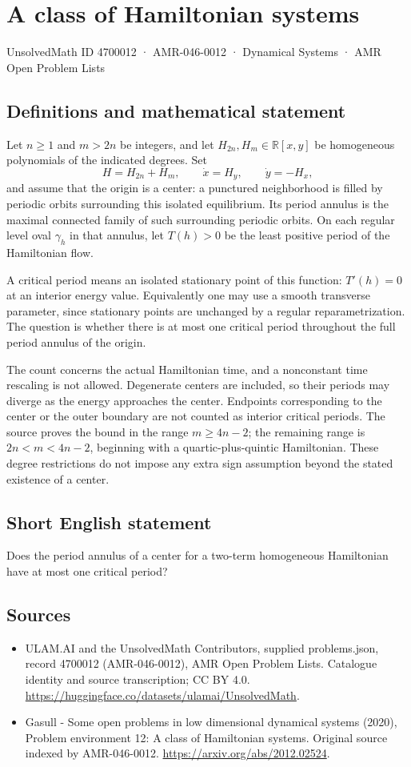 \documentclass[11pt,a4paper]{article}
\begin{document}
\section*{A class of Hamiltonian systems}\label{4700012}
{\small UnsolvedMath ID 4700012 · AMR-046-0012 · Dynamical Systems · AMR Open Problem Lists}
\subsection{Definitions and mathematical statement}
Let $n\ge1$ and $m>2n$ be integers, and let $H_{2n},H_m\in\mathbb R[x,y]$
be homogeneous polynomials of the indicated degrees. Set
\[
 H=H_{2n}+H_m,\qquad \dot x=H_y,\qquad \dot y=-H_x,
\]
and assume that the origin is a center: a punctured neighborhood is filled
by periodic orbits surrounding this isolated equilibrium. Its period
annulus is the maximal connected family of such surrounding periodic orbits.
On each regular level oval $\gamma_h$ in that annulus, let
$T(h)>0$ be the least positive period of the Hamiltonian flow.

A critical period means an isolated stationary point of this function:
$T'(h)=0$ at an interior energy value. Equivalently one may use a smooth
transverse parameter, since stationary points are unchanged by a regular
reparametrization. The question is whether there is at most one critical
period throughout the full period annulus of the origin.

The count concerns the actual Hamiltonian time, and a nonconstant time
rescaling is not allowed. Degenerate centers are included, so their periods
may diverge as the energy approaches the center. Endpoints corresponding to
the center or the outer boundary are not counted as interior critical
periods. The source proves the bound in the range $m\ge4n-2$; the remaining
range is $2n<m<4n-2$, beginning with a quartic-plus-quintic Hamiltonian.
These degree restrictions do not impose any extra sign assumption beyond
the stated existence of a center.
\subsection{Short English statement}
Does the period annulus of a center for a two-term homogeneous Hamiltonian have at most one critical period?
\subsection{Sources}
\begin{itemize}
\item[S1] ULAM.AI and the UnsolvedMath Contributors, supplied problems.json, record 4700012 (AMR-046-0012), AMR Open Problem Lists. Catalogue identity and source transcription; CC BY 4.0.
\url{https://huggingface.co/datasets/ulamai/UnsolvedMath}.
\item[S2] Gasull - Some open problems in low dimensional dynamical systems (2020), Problem environment 12: A class of Hamiltonian systems. Original source indexed by AMR-046-0012.
\url{https://arxiv.org/abs/2012.02524}.
\end{itemize}
\end{document}
